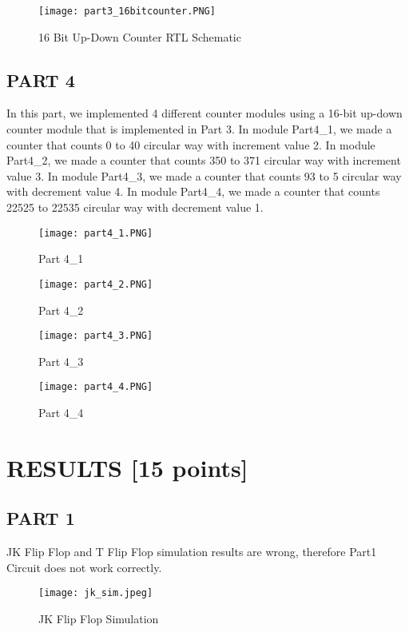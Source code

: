 \documentclass[pdftex,12pt,a4paper]{article}
\begin{document}
\begin{figure}[hbt!]
	\centering
	\texttt{[image: part3\_16bitcounter.PNG]}	
	\caption{16 Bit Up-Down Counter RTL Schematic}
	\label{fig1}
\end{figure}

\clearpage

\subsection{PART 4}
In this part, we implemented 4 different counter modules using a 16-bit up-down counter module that is implemented in Part 3. In module Part4\_1, we made a counter that counts 0 to 40 circular way with increment value 2. In module Part4\_2, we made a counter that counts 350 to 371 circular way with increment value 3. In module Part4\_3, we made a counter that counts 93 to 5 circular way with decrement value 4.  In module Part4\_4, we made a counter that counts 22525 to 22535 circular way with decrement value 1. 

\begin{figure}[hbt!]
	\centering
	\texttt{[image: part4\_1.PNG]}	
	\caption{Part 4\_1}
	\label{fig1}
\end{figure}

\begin{figure}[hbt!]
	\centering
	\texttt{[image: part4\_2.PNG]}	
	\caption{Part 4\_2}
	\label{fig1}
\end{figure}
\begin{figure}[hbt!]
	\centering
	\texttt{[image: part4\_3.PNG]}	
	\caption{Part 4\_3}
	\label{fig1}
\end{figure}
\begin{figure}[hbt!]
	\centering
	\texttt{[image: part4\_4.PNG]}	
	\caption{Part 4\_4}
	\label{fig1}
\end{figure}
\clearpage


\section{RESULTS [15 points]}
\subsection{PART 1}
JK Flip Flop and T Flip Flop simulation results are wrong, therefore Part1 Circuit does not work correctly.

\begin{figure}[hbt!]
	\centering
	\texttt{[image: jk\_sim.jpeg]}	
	\caption{JK Flip Flop Simulation}
	\label{fig1}
\end{figure}
\end{document}
